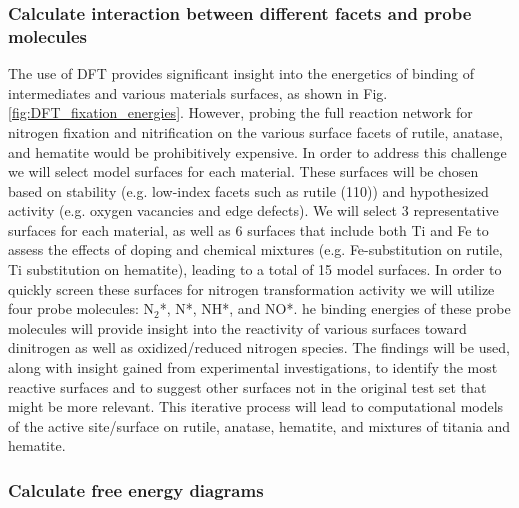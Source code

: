 \subsubsection{Calculate interaction between different facets and probe molecules}
\vspace{1mm}The use of DFT provides significant insight into the energetics of binding of intermediates and various materials surfaces, as shown in Fig. \ref{fig:DFT_fixation_energies}. However, probing the full reaction network for nitrogen fixation and nitrification on the various surface facets of rutile, anatase, and hematite would be prohibitively expensive. In order to address this challenge we will select model surfaces for each material. These surfaces will be chosen based on stability (e.g. low-index facets such as rutile (110)) and hypothesized activity (e.g. oxygen vacancies and edge defects). We will select 3 representative surfaces for each material, as well as 6 surfaces that include both Ti and Fe to assess the effects of doping and chemical mixtures (e.g. Fe-substitution on rutile, Ti substitution on hematite), leading to a total of 15 model surfaces. In order to quickly screen these surfaces for nitrogen transformation activity we will utilize four probe molecules: N$_2$*, N*, NH*, and NO*. he binding energies of these probe molecules will provide insight into the reactivity of various 
surfaces toward dinitrogen as well as oxidized/reduced nitrogen species. The findings will be used, along with insight gained from experimental investigations, to identify the most reactive surfaces and to suggest other surfaces not in the original test set that might be more relevant. This iterative process will lead to computational models of the active site/surface on rutile, anatase, hematite, and mixtures of titania and hematite.
\vspace{1mm}

\subsubsection{Calculate free energy diagrams}
\label{sec:SA3_3}
\vspace{1mm}

